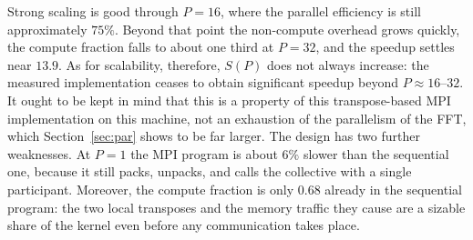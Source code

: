 \documentclass[conference,onecolumn]{IEEEtran}
\theoremstyle{course}
\begin{document}
Strong scaling is good through $P=16$, where the parallel efficiency is
still approximately $75\%$. Beyond that point the non-compute overhead grows
quickly, the compute fraction falls to about one third at $P=32$, and the
speedup settles near $13.9$. As for scalability, therefore, $S(P)$ does not
always increase: the measured implementation ceases to obtain significant
speedup beyond $P\approx16$--$32$. It ought to be kept in mind that this is
a property of this transpose-based MPI implementation on this machine, not
an exhaustion of the parallelism of the FFT, which Section~\ref{sec:par}
shows to be far larger. The design has two further weaknesses. At $P=1$ the
MPI program
is about $6\%$ slower than the sequential one, because it still packs,
unpacks, and calls the collective with a single participant. Moreover, the
compute fraction is only $0.68$ already in the sequential program: the two
local transposes and the memory traffic they cause are a sizable share of
the kernel even before any communication takes place.
\end{document}
